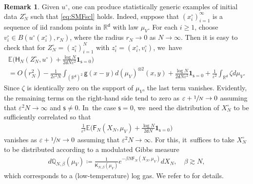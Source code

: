 \documentclass[10pt]{amsart}
\theoremstyle{plain}
\theoremstyle{definition}
\newtheorem{remark}[thm]{Remark}
\newcommand{\R}{{\mathbb{R}}}
\newcommand{\E}{{\mathbb{E}}}
\let\be\beta
\let\vep\varepsilon
\let\uz Z
\newcommand{\XN}{X_N}
\newcommand{\indic}{\mathbf{1}}
\newcommand{\Fr}{\mathsf{F}}
\newcommand{\Hr}{\mathsf{H}}
\renewcommand{\d}{\mathsf{d}}
\newcommand{\g}{{\mathsf{g}}}
\newcommand{\s}{\mathsf{s}}
\begin{document}
\begin{remark}\label{rem:initMEvan}
Given $u^\circ$, one can produce statistically generic examples of initial data $\uz_N^\circ$ such that \eqref{eq:SMFscl} holds. Indeed, suppose that $(x_i^\circ)_{i=1}^\infty$ is a sequence of iid random points in $\R^\d$ with law $\mu_V$. For each $i\ge 1$, choose $v_i^\circ \in B(u^\circ(x_i^\circ), r_N)$, where the radius $r_N\to 0$ as $N\to\infty$. Then it is easy to check that for $\uz_N^\circ = (z_i^\circ)_{i=1}^N$ with $z_i^\circ = (x_i^\circ,v_i^\circ)$, we~have
\begin{multline}\label{eq:initMEvan}
\E\Big(\Hr_{N}(\uz_N^\circ, u^\circ) + \frac{\log N}{2\d N \vep^2}\indic_{\s=0} \Big)\\
= {O(r_N^2)} - \frac{1}{2\vep^2 N}\int_{(\R^\d)^2}\g(x-y)d(\mu_V)^{\otimes2}(x,y)
+ \frac{\log N}{2\d N \vep^2}\indic_{\s=0} + \frac{1}{\vep^2}\int_{\R^\d}\zeta d\mu_V.
\end{multline}
Since $\zeta$ is identically zero on the support of $\mu_V$, the last term vanishes. Evidently, the remaining terms on the right-hand side tend to zero as $\vep+\sfrac{1}{N}\to 0$ assuming that $\vep^2N\to\infty$ and $\s\ne 0$. In~the case $\s=0$, we~need the distribution of $\XN^\circ$ to be sufficiently correlated so that
\begin{align*}
\frac{1}{\vep^2}\E\Big(\Fr_{N}(\XN,\mu_V) + \frac{\log N}{2\d N}\indic_{\s=0}\Big)
\end{align*}
vanishes as $\vep+\sfrac1N\to 0$ assuming that $\vep^2N \to\infty$. For this, it~suffices to take $\XN^\circ$ to be distributed according to a modulated Gibbs measure
\begin{align*}
d\mathbb{Q}_{N,\be}(\mu_V) \coloneqq \frac{1}{\mathsf{K}_{N,\be}(\mu_V)}e^{-\be N\Fr_N(\XN,\mu_V)}d\XN, \quad \be \gtrsim N,
\end{align*}
which corresponds to a (low-temperature) log gas. We refer to \cite[Chap.\,5 \& 6]{SerfatyLN} for details.
\end{remark}
\end{document}
